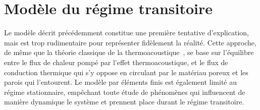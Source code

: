 %	
%	




\section{Modèle du régime transitoire} \label{chap:ModeleTemporel}
Le modèle décrit précédemment constitue une première tentative d'explication, mais est trop rudimentaire pour représenter fidèlement la réalité. Cette approche, de même que la théorie classique de la thermoacoustique~\cite{swift_thermoacoustic_1988}, se base sur l'équilibre entre le flux de chaleur pompé par l'effet thermoacoustique, et le flux de conduction thermique qui s'y oppose en circulant par le matériau poreux et les parois qui l'entourent. Le modèle par éléments finis est également limité au régime stationnaire, empêchant toute étude de phénomènes qui influencent de manière dynamique le système et prennent place durant le régime transitoire.\smallskip

